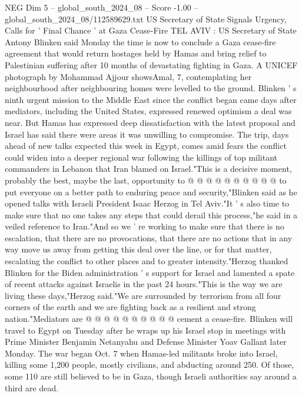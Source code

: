 \begin{textsample}{NEG Dim 5 – global\_south\_2024\_08 – Score -1.00 – global\_south\_2024\_08/112589629.txt}  \label{ex:f5_neg_121}
US Secretary of State Signals Urgency, Calls for ' Final Chance ' at Gaza Cease-Fire TEL AVIV : US Secretary of State Antony Blinken said Monday the time is now to conclude a Gaza cease-fire agreement that would return hostages held by Hamas and bring relief to Palestinian suffering after 10 months of devastating fighting in Gaza.
A UNICEF photograph by Mohammad Ajjour showsAmal, 7, contemplating her neighbourhood after neighbouring homes were levelled to the ground.
Blinken ' s ninth urgent mission to the Middle East since the conflict began came days after mediators, including the United States, expressed renewed optimism a deal was near.
But Hamas has expressed deep dissatisfaction with the latest proposal and Israel has said there were areas it was unwilling to compromise.
The trip, days ahead of new talks expected this week in Egypt, comes amid fears the conflict could widen into a deeper regional war following the killings of top militant commanders in Lebanon that Iran blamed on Israel."This is a decisive moment, probably the best, maybe the last, opportunity to @ @ @ @ @ @ @ @ @ @ to put everyone on a better path to enduring peace and security,"Blinken said as he opened talks with Israeli President Isaac Herzog in Tel Aviv."It ' s also time to make sure that no one takes any steps that could derail this process,"he said in a veiled reference to Iran."And so we ' re working to make sure that there is no escalation, that there are no provocations, that there are no actions that in any way move us away from getting this deal over the line, or for that matter, escalating the conflict to other places and to greater intensity."Herzog thanked Blinken for the Biden administration ' s support for Israel and lamented a spate of recent attacks against Israelis in the past 24 hours."This is the way we are living these days,"Herzog said."We are surrounded by terrorism from all four corners of the earth and we are fighting back as a resilient and strong nation."Mediators are @ @ @ @ @ @ @ @ @ @ cement a cease-fire.
Blinken will travel to Egypt on Tuesday after he wraps up his Israel stop in meetings with Prime Minister Benjamin Netanyahu and Defense Minister Yoav Gallant later Monday.
The war began Oct. 7 when Hamas-led militants broke into Israel, killing some 1,200 people, mostly civilians, and abducting around 250.
Of those, some 110 are still believed to be in Gaza, though Israeli authorities say around a third are dead.

\end{textsample}

